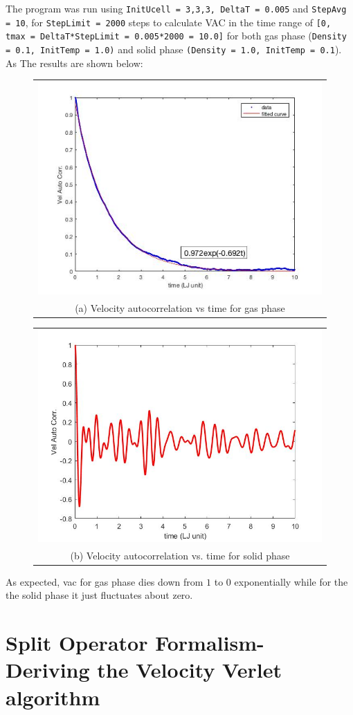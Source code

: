 \documentclass[11pt, oneside]{article}   	%
\begin{document}
The program was run using \texttt{InitUcell = {3,3,3}, DeltaT = 0.005} and \texttt{StepAvg = 10}, for \texttt{StepLimit = 2000} steps to calculate VAC in the time range of \texttt{[0, tmax = DeltaT*StepLimit = 0.005*2000 = 10.0]} for both gas phase (\texttt{Density = 0.1, InitTemp = 1.0)} and solid phase \texttt{(Density = 1.0, InitTemp = 0.1}). As The results are shown below:
	\begin{figure}[!htbp]
	\centering
		\begin{tabular}{@{}c@{}}
		\includegraphics[scale=0.55]{vacGas.jpg} \\[\abovecaptionskip]
		\tiny (a) Velocity autocorrelation vs time for gas phase
		\end{tabular}
		\begin{tabular}{@{}c@{}}
		\includegraphics[scale=0.4]{vacSolid} \\[\abovecaptionskip]
		\tiny (b) Velocity autocorrelation vs. time for solid phase
		\end{tabular}
		
	\end{figure}
	
As expected, vac for gas phase dies down from $1$ to $0$ exponentially while for the the solid phase it just fluctuates about zero.
\pagebreak
\section{Split Operator Formalism- Deriving the Velocity Verlet algorithm}
\end{document}
